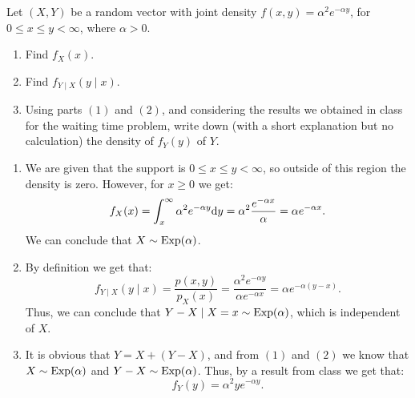 \documentclass[11pt,a4paper]{article}
\begin{document}
\begin{exercise}
  Let $(X,Y)$ be a random vector with
  joint density $f(x,y) = \alpha^2 e^{-\alpha y}$,
  for $0 \le x \le y < \infty$, where $\alpha > 0$.
  \begin{enumerate}
    \item[(1)] Find $f_X(x)$.
    \item[(2)] Find $f_{Y \mid X}(y \mid x)$.
    \item[(3)] Using parts $(1)$ and $(2)$,
      and considering the results we obtained in class for the waiting time
      problem, write down (with a short explanation but no calculation)
      the density of $f_Y(y)$ of $Y$.
  \end{enumerate}
\end{exercise}
\begin{solution} \phantom{}
  \begin{enumerate}
    \item[(1)] We are given that the support is $0 \le x \le y < \infty$,
      so outside of this region the density is zero. 
      However, for $x \geq 0$ we get:
      \[
        f_X(x) =
        \int_{x}^{\infty} \alpha^2 e^{-\alpha y} \dy =
        \alpha^2 \frac{e^{-\alpha x}}{\alpha} =
        \alpha e^{-\alpha x}.
      \]
      We can conclude that $X \sim \operatorname{Exp}(\alpha)$.
    \item[(2)] By definition we get that:
      \[
        f_{Y \mid X}(y \mid x) =
        \frac{p(x,y)}{p_X(x)} =
        \frac{\alpha^2 e^{-\alpha y}}{\alpha e^{-\alpha x}} =
        \alpha e^{-\alpha (y - x)}.
      \]
      Thus, we can conclude that $Y - X \mid X = x \sim \operatorname{Exp}(\alpha)$,
      which is independent of $X$.
    \item[(3)] It is obvious that $Y = X + (Y - X)$,
      and from $(1)$ and $(2)$ we know that $X \sim \operatorname{Exp}(\alpha)$
      and $Y - X \sim \operatorname{Exp}(\alpha)$.
      Thus, by a result from class we get that:
      \[
        f_Y(y) =
        \alpha^2 y e^{- \alpha y}.
      \]
  \end{enumerate}
\end{solution}
\end{document}
